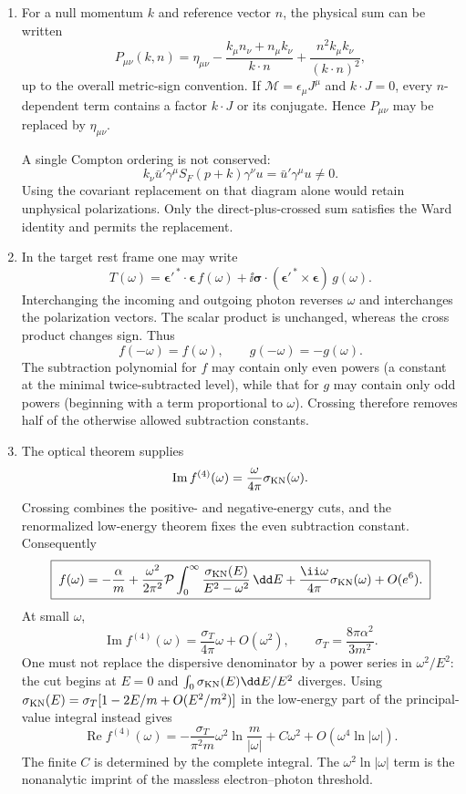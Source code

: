\begin{enumerate}
\begin{enumerate}
\item
For a null momentum \(k\) and reference vector \(n\), the physical sum can
be written
\[
 P_{\mu\nu}(k,n)=\eta_{\mu\nu}
 -\frac{k_\mu n_\nu+n_\mu k_\nu}{k\cdot n}
 +\frac{n^2k_\mu k_\nu}{(k\cdot n)^2},
\]
up to the overall metric-sign convention.  If
\(\mathcal M=\epsilon_\mu J^\mu\) and \(k\cdot J=0\), every
\(n\)-dependent term contains a factor \(k\cdot J\) or its conjugate.
Hence \(P_{\mu\nu}\) may be replaced by \(\eta_{\mu\nu}\).

A single Compton ordering is not conserved:
\[
 k_\nu\bar u'\gamma^\mu S_F(p+k)\gamma^\nu u
 =\bar u'\gamma^\mu u\ne0.
\]
Using the covariant replacement on that diagram alone would retain
unphysical polarizations.  Only the direct-plus-crossed sum satisfies the
Ward identity and permits the replacement.
\item
In the target rest frame one may write
\[
 T(\omega)=
 \boldsymbol\epsilon'^{\,*}\cdot\boldsymbol\epsilon\,f(\omega)
 +\ii\boldsymbol\sigma\cdot
 (\boldsymbol\epsilon'^{\,*}\times\boldsymbol\epsilon)\,g(\omega).
\]
Interchanging the incoming and outgoing photon reverses \(\omega\) and
interchanges the polarization vectors.  The scalar product is unchanged,
whereas the cross product changes sign.  Thus
\[
 \boxed{f(-\omega)=f(\omega),\qquad
 g(-\omega)=-g(\omega).}
\]
The subtraction polynomial for \(f\) may contain only even powers (a
constant at the minimal twice-subtracted level), while that for \(g\) may
contain only odd powers (beginning with a term proportional to \(\omega\)).
Crossing therefore removes half of the otherwise allowed subtraction
constants.
\item
The optical theorem supplies
\[
 \operatorname{Im}f^{(4)}(\omega)
 =\frac{\omega}{4\pi}\sigma_{\rm KN}(\omega).
\]
Crossing combines the positive- and negative-energy cuts, and the
renormalized low-energy theorem fixes the even subtraction constant.
Consequently
\[
 \boxed{\;
 f(\omega)=-\frac{\alpha}{m}
 +\frac{\omega^2}{2\pi^2}\mathcal P
 \int_0^\infty\frac{\sigma_{\rm KN}(E)}
 {E^2-\omega^2}\,\dd E
 +\frac{\ii\omega}{4\pi}\sigma_{\rm KN}(\omega)
 +O(e^6).\;}
\]
At small \(\omega\),
\[
 \operatorname{Im}f^{(4)}(\omega)
 =\frac{\sigma_T}{4\pi}\omega+O(\omega^2),
\qquad
\sigma_T=\frac{8\pi\alpha^2}{3m^2}.
\]
One must not replace the dispersive denominator by a power series in
\(\omega^2/E^2\): the cut begins at \(E=0\) and
\(\int_0\sigma_{\rm KN}(E)\dd E/E^2\) diverges.  Using
\(\sigma_{\rm KN}(E)=\sigma_T[1-2E/m+O(E^2/m^2)]\) in the
low-energy part of the principal-value integral instead gives
\[
 \operatorname{Re}f^{(4)}(\omega)
 =-\frac{\sigma_T}{\pi^2m}\omega^2
 \ln\frac{m}{|\omega|}+C\omega^2
 +O(\omega^4\ln|\omega|).
\]
The finite \(C\) is determined by the complete integral.  The
\(\omega^2\ln|\omega|\) term is the nonanalytic imprint of the massless
electron--photon threshold.
\end{enumerate}
\end{enumerate}
